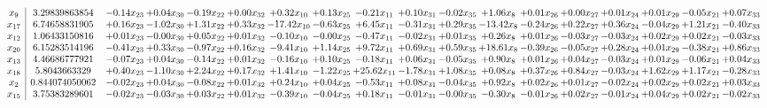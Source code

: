 \documentclass[9pt]{article}
\begin{document}
 \[\begin{array}{c| c c@{\hskip 2pt} c@{\hskip 2pt} c@{\hskip 2pt} c@{\hskip 2pt} c@{\hskip 2pt} c@{\hskip 2pt} c@{\hskip 2pt} c@{\hskip 2pt} c@{\hskip 2pt} c@{\hskip 2pt} c@{\hskip 2pt} c@{\hskip 2pt} c@{\hskip 2pt} c@{\hskip 2pt} c@{\hskip 2pt} c@{\hskip 2pt} }
 x_{9}   &  3.29839863854 & -0.14 x_{23} & +  0.04 x_{30} & -0.19 x_{22} & +  0.00 x_{32} & +  0.32 x_{10} & +  0.13 x_{25} & -0.21 x_{11} & +  0.10 x_{31} & -0.02 x_{35} & +  1.06 x_{8} & +  0.01 x_{26} & +  0.00 x_{27} & +  0.01 x_{24} & +  0.01 x_{29} & -0.05 x_{21} & +  0.07 x_{33}\\
 x_{17}   &  6.74658831905 & +  0.16 x_{23} & -1.02 x_{30} & +  1.31 x_{22} & +  0.33 x_{32} & -17.42 x_{10} & -0.63 x_{25} & +  6.45 x_{11} & -0.31 x_{31} & +  0.29 x_{35} & -13.42 x_{8} & -0.24 x_{26} & +  0.22 x_{27} & +  0.36 x_{24} & -0.04 x_{29} & +  1.21 x_{21} & -0.40 x_{33}\\
 x_{12}   &  1.06433150816 & +  0.01 x_{23} & -0.00 x_{30} & +  0.05 x_{22} & +  0.01 x_{32} & -0.10 x_{10} & -0.00 x_{25} & -0.47 x_{11} & -0.02 x_{31} & +  0.01 x_{35} & +  0.26 x_{8} & +  0.01 x_{26} & -0.03 x_{27} & -0.03 x_{24} & +  0.02 x_{29} & +  0.02 x_{21} & -0.03 x_{33}\\
 x_{20}   &  6.15283514196 & -0.41 x_{23} & +  0.33 x_{30} & -0.97 x_{22} & +  0.16 x_{32} & -9.41 x_{10} & +  1.14 x_{25} & +  9.72 x_{11} & +  0.69 x_{31} & +  0.59 x_{35} & + 18.61 x_{8} & -0.39 x_{26} & -0.05 x_{27} & +  0.28 x_{24} & +  0.01 x_{29} & -0.38 x_{21} & +  0.86 x_{33}\\
 x_{13}   &  4.46686777921 & -0.07 x_{23} & +  0.04 x_{30} & -0.14 x_{22} & +  0.01 x_{32} & -0.16 x_{10} & +  0.10 x_{25} & -0.18 x_{11} & +  0.06 x_{31} & -0.05 x_{35} & +  0.90 x_{8} & +  0.01 x_{26} & +  0.04 x_{27} & -0.03 x_{24} & +  0.01 x_{29} & -0.06 x_{21} & +  0.04 x_{33}\\
 x_{18}   &  5.8043663329 & +  0.40 x_{23} & -1.10 x_{30} & +  2.24 x_{22} & +  0.17 x_{32} & +  1.41 x_{10} & -1.22 x_{25} & + 25.62 x_{11} & -1.78 x_{31} & +  1.08 x_{35} & +  0.08 x_{8} & +  0.37 x_{26} & +  0.84 x_{27} & -0.03 x_{24} & +  1.62 x_{29} & +  1.17 x_{21} & -0.28 x_{33}\\
 x_{2}   &  0.844074050062 & -0.02 x_{23} & +  0.04 x_{30} & -0.08 x_{22} & +  0.01 x_{32} & +  0.24 x_{10} & +  0.04 x_{25} & -0.53 x_{11} & +  0.08 x_{31} & -0.04 x_{35} & +  0.92 x_{8} & +  0.02 x_{26} & +  0.01 x_{27} & -0.02 x_{24} & +  0.02 x_{29} & +  0.02 x_{21} & +  0.03 x_{33}\\
 x_{15}   &  3.75383289601 & -0.02 x_{23} & -0.03 x_{30} & +  0.03 x_{22} & +  0.01 x_{32} & -0.39 x_{10} & -0.04 x_{25} & +  0.18 x_{11} & -0.01 x_{31} & -0.00 x_{35} & -0.30 x_{8} & -0.01 x_{26} & +  0.02 x_{27} & -0.01 x_{24} & +  0.04 x_{29} & +  0.02 x_{21} & -0.02 x_{33}\\

\end{array}\]
\end{document}
